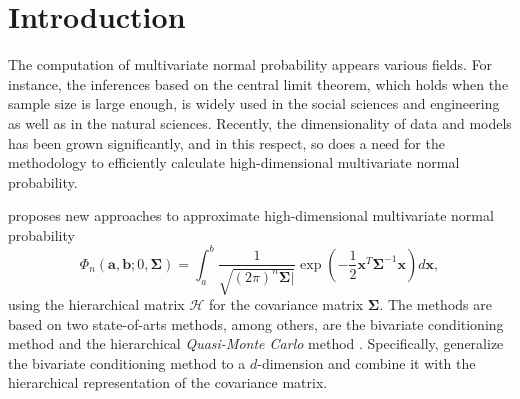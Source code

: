 \section{Introduction}

The computation of multivariate normal probability appears various fields. For instance, the inferences based on the central limit theorem, which holds when the sample size is large enough, is widely used in the social sciences and engineering as well as in the natural sciences. Recently, the dimensionality of data and models has been grown significantly, and in this respect, so does a need for the methodology to efficiently calculate high-dimensional multivariate normal probability.

\citet{cao2019hierarchical} proposes new approaches to approximate high-dimensional multivariate normal probability 
\begin{equation}\label{eqn:normalprob}
    \Phi_n(\mathbf{a}, \mathbf{b}; 0, \boldsymbol{\Sigma}) = \int_a^b \frac{1}{\sqrt{(2\pi)^n  \boldsymbol{\Sigma}|}} \exp\left( -\frac{1}{2} \mathbf{x}^T \boldsymbol{\Sigma}^{-1} \mathbf{x} \right) d\mathbf{x},
\end{equation}
using the hierarchical matrix $\mathcal{H}$ \citep{hackbusch2015hierarchical} for the covariance matrix $\boldsymbol{\Sigma}$. The methods are based on two state-of-arts methods, among others, are the bivariate conditioning method \citep{trinh2015bivariate} and the hierarchical \textit{Quasi-Monte Carlo} method \citep{genton2018hierarchical}. Specifically, \citet{cao2019hierarchical} generalize the bivariate conditioning method to a $d$-dimension and combine it with the hierarchical representation of the covariance matrix. 

